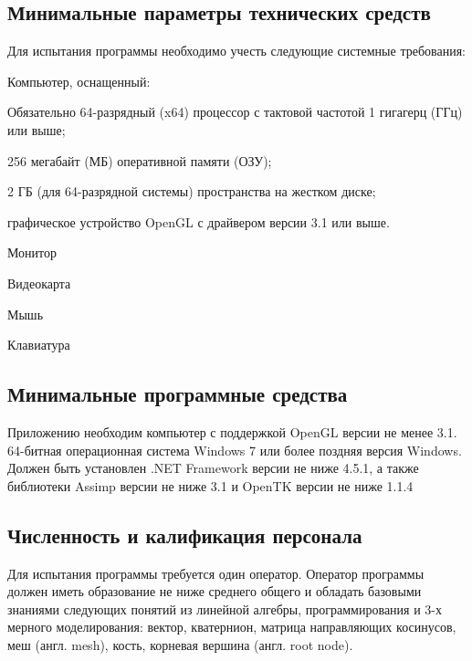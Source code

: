 \subsection{Минимальные параметры технических средств}
Для испытания программы необходимо учесть следующие системные требования:
\begin{my_enumerate}
\item Компьютер, оснащенный:
    \begin{my_enumerate}
    \item Обязательно 64-разрядный (x64) процессор с тактовой частотой 1 гигагерц (ГГц) или выше;
    \item 256 мегабайт (МБ) оперативной памяти (ОЗУ);
    \item 2 ГБ (для 64-разрядной системы) пространства на жестком диске;
    \item графическое устройство OpenGL с драйвером версии 3.1 или выше.
    \end{my_enumerate}
\item Монитор
\item Видеокарта
\item Мышь
\item Клавиатура
\end{my_enumerate}


\subsection{Минимальные программные средства}
Приложению необходим компьютер с поддержкой OpenGL версии не менее 3.1. 64-битная операционная система Windows 7 или более поздняя версия Windows. Должен быть установлен .NET Framework версии не ниже 4.5.1, а также библиотеки Assimp версии не ниже 3.1 и OpenTK версии не ниже 1.1.4

\subsection{Численность и калификация персонала}
Для испытания программы требуется один оператор. Оператор программы должен иметь образование не ниже среднего общего и обладать базовыми знаниями следующих понятий из линейной алгебры, программирования и 3-х мерного моделирования: вектор, кватернион, матрица направляющих косинусов, меш (англ. mesh), кость, корневая вершина (англ. root node).
